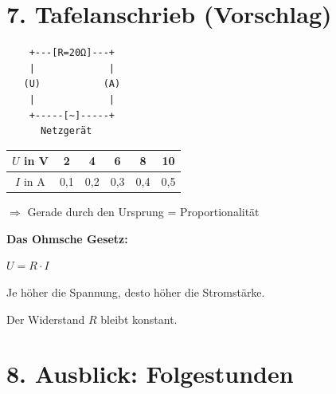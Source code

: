 \documentclass[11pt, a4paper]{article}
\begin{document}

\section*{7. Tafelanschrieb (Vorschlag)}

\begin{infobox}
\begin{center}
\begin{verbatim}
    +---[R=20Ω]---+
    |             |
   (U)           (A)
    |             |
    +-----[~]-----+
      Netzgerät
\end{verbatim}
\end{center}
\end{infobox}

\begin{infobox}
\begin{tabular}{|c|c|c|c|c|c|}
\hline
$U$ in V & 2 & 4 & 6 & 8 & 10 \\
\hline
$I$ in A & 0,1 & 0,2 & 0,3 & 0,4 & 0,5 \\
\hline
\end{tabular}

\vspace{0.5em}
$\Rightarrow$ Gerade durch den Ursprung = Proportionalität
\end{infobox}

\begin{infobox}
\textbf{Das Ohmsche Gesetz:}

\vspace{0.5em}
\begin{center}
{\Large $U = R \cdot I$}
\end{center}

\vspace{0.5em}
Je höher die Spannung, desto höher die Stromstärke.

Der Widerstand $R$ bleibt konstant.
\end{infobox}


\section*{8. Ausblick: Folgestunden}
\end{document}
